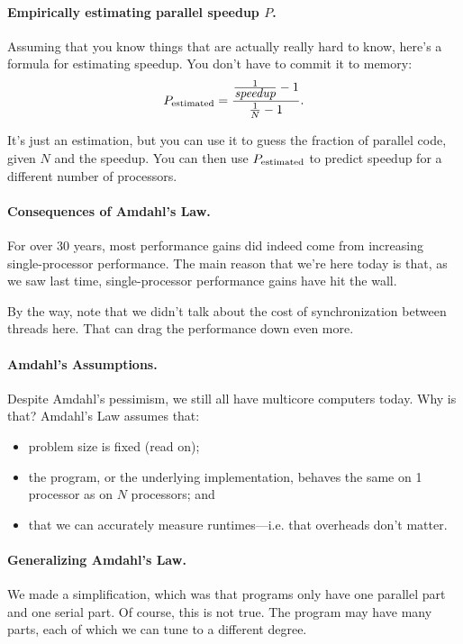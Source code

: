\documentclass[a4paper]{report}
\begin{document}
   \paragraph{Empirically estimating parallel speedup $P$.}
Assuming that you know things that are actually really hard to know, here's a formula for estimating speedup. You don't have to commit it to memory:
  \[P_{\mbox{\scriptsize estimated}} = \frac{\frac{1}{\mbox{\em speedup}}-1}{\frac{1}{N}-1}.\]

It's just an estimation, but you can use it to guess the fraction of parallel code, given $N$ and the speedup. You can then use $P_{\mbox{\scriptsize estimated}}$ to predict speedup for a different number of processors.

\paragraph{Consequences of Amdahl's Law.}
For over 30 years, most performance gains did indeed come from
increasing single-processor performance. The main reason that we're
here today is that, as we saw last time,
single-processor performance gains have hit the wall.

By the way, note that we didn't talk about the cost of synchronization
between threads here. That can drag the performance down even more.

\paragraph{Amdahl's Assumptions.}
Despite Amdahl's pessimism, we still all have multicore computers today.
Why is that? Amdahl's Law assumes that:
\begin{itemize}[noitemsep]
    \item problem size is fixed (read on);
    \item the program, or the underlying implementation, behaves the same on 1 processor as on $N$ processors; and
    \item that we can accurately measure runtimes---i.e. that overheads don't matter.
\end{itemize}

\paragraph{Generalizing Amdahl's Law.} We made a simplification,
which was that programs only have one parallel part and one serial part.
Of course, this is not true. The program may have many parts,
 each of which we can tune to a different degree.
\end{document}
